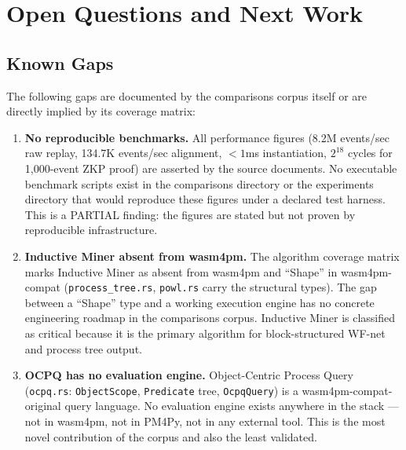 
\section{Open Questions and Next Work}
\label{sec:comparisons-open}

\subsection{Known Gaps}
\label{sec:comparisons-open-gaps}

The following gaps are documented by the comparisons corpus itself or are
directly implied by its coverage matrix:

\begin{enumerate}
  \item \textbf{No reproducible benchmarks.} All performance figures
    (8.2M events/sec raw replay, 134.7K events/sec alignment, $< 1$ms
    instantiation, $2^{18}$ cycles for 1,000-event ZKP proof) are asserted
    by the source documents. No executable benchmark scripts exist in the
    comparisons directory or the experiments directory that would reproduce
    these figures under a declared test harness. This is a PARTIAL finding:
    the figures are stated but not proven by reproducible infrastructure.

  \item \textbf{Inductive Miner absent from wasm4pm.} The algorithm coverage
    matrix marks Inductive Miner as absent from wasm4pm and ``Shape'' in
    wasm4pm-compat (\texttt{process\_tree.rs}, \texttt{powl.rs} carry the
    structural types). The gap between a ``Shape'' type and a working
    execution engine has no concrete engineering roadmap in the comparisons
    corpus. Inductive Miner is classified as critical because it is the
    primary algorithm for block-structured WF-net and process tree output.

  \item \textbf{OCPQ has no evaluation engine.} Object-Centric Process Query
    (\texttt{ocpq.rs}: \texttt{ObjectScope}, \texttt{Predicate} tree,
    \texttt{OcpqQuery}) is a wasm4pm-compat-original query language. No
    evaluation engine exists anywhere in the stack --- not in wasm4pm, not
    in PM4Py, not in any external tool. This is the most novel contribution
    of the corpus and also the least validated.


\end{enumerate}
